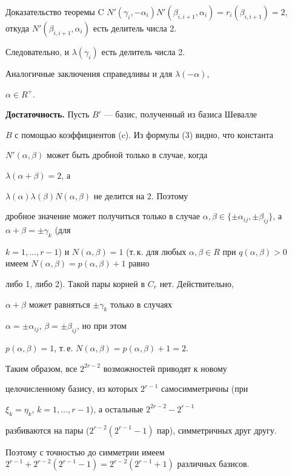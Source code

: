 \begin{pf*}{Доказательство теоремы C}
$N'(\gamma_i,-\alpha_i)N'(\beta_{i,i+1},\alpha_i)=r_i(\beta_{i,i+1})


=2$, откуда $N'(\beta_{i,i+1},\alpha_i)$ есть делитель числа 2.


Следовательно, и $\lambda(\gamma_i)$ есть делитель числа 2.





Аналогичные заключения справедливы и для $\lambda(-\alpha)$,


$\alpha\in R^+$.


\medskip





{\bf Достаточность.} Пусть $B'$ --- базис, полученный из базиса Шевалле


$B$ с помощью коэффициентов (c). Из формулы (3) видно, что константа


$N'(\alpha,\beta)$ может быть дробной только в случае, когда


$\lambda(\alpha+\beta)=2$, а


$\lambda(\alpha)\lambda(\beta)N(\alpha,\beta)$ не делится на 2. Поэтому


дробное значение может получиться только в случае $\alpha,\beta\in


\{\pm\alpha_{ij},\pm\beta_{ij}\}$, а $\alpha+\beta=\pm\gamma_k$ (для


$k=1,\dotsc,r-1$) и $N(\alpha,\beta)=1$ (т.\,к. для любых $\alpha,\beta\in


R$ при $q(\alpha,\beta)>0$ имеем $N(\alpha,\beta)=p(\alpha,\beta)+1$ равно


либо 1, либо 2). Такой пары корней в $C_r$ нет. Действительно,


$\alpha+\beta$ может равняться $\pm\gamma_k$ только в случаях


$\alpha=\pm\alpha_{ij}$, $\beta=\pm\beta_{ij}$, но при этом


$p(\alpha,\beta)=1$, т.\,е. $N(\alpha,\beta)=p(\alpha,\beta)+1=2$.





Таким образом, все $2^{2r-2}$ возможностей приводят к новому


целочисленному базису, из которых $2^{r-1}$ самосимметричны (при


$\xi_k=\eta_k$, $k=1,\dotsc,r-1$), а остальные $2^{2r-2}-2^{r-1}$


разбиваются на пары ($2^{r-2}(2^{r-1}-1)$ пар), симметричных друг другу.


Поэтому с точностью до симметрии имеем $2^{r-1}+2^{r-2}(2^{r-1}-1)=


2^{r-2}(2^{r-1}+1)$ различных базисов.


\end{pf*}





